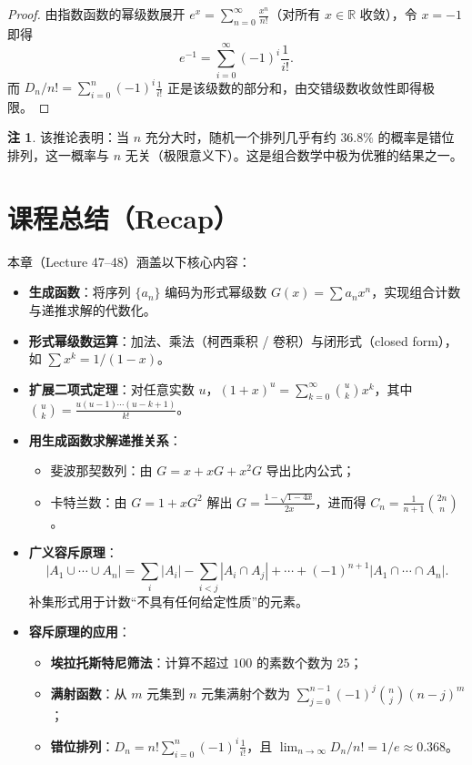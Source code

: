 \documentclass[UTF8,11pt,a4paper]{ctexbook}   %
\theoremstyle{definition}
\newtheorem{remark}{注}[section]
\begin{document}
\begin{proof}
由指数函数的幂级数展开 $e^x=\sum_{n=0}^{\infty}\frac{x^n}{n!}$（对所有 $x\in\mathbb{R}$ 收敛），令 $x=-1$ 即得
\[
e^{-1}=\sum_{i=0}^{\infty}(-1)^i\frac{1}{i!}.
\]
而 $D_n/n!=\sum_{i=0}^{n}(-1)^i\frac{1}{i!}$ 正是该级数的部分和，由交错级数收敛性即得极限。
\end{proof}

\begin{remark}
该推论表明：当 $n$ 充分大时，随机一个排列几乎有约 $36.8\%$ 的概率是错位排列，这一概率与 $n$ 无关（极限意义下）。这是组合数学中极为优雅的结果之一。
\end{remark}

\section*{课程总结（Recap）}

本章（Lecture 47--48）涵盖以下核心内容：

\begin{itemize}
    \item \textbf{生成函数}：将序列 $\{a_n\}$ 编码为形式幂级数 $G(x)=\sum a_n x^n$，实现组合计数与递推求解的代数化。
    \item \textbf{形式幂级数运算}：加法、乘法（柯西乘积 / 卷积）与闭形式（closed form），如 $\sum x^k=1/(1-x)$。
    \item \textbf{扩展二项式定理}：对任意实数 $u$，$(1+x)^u=\sum_{k=0}^{\infty}\binom{u}{k}x^k$，其中 $\binom{u}{k}=\frac{u(u-1)\cdots(u-k+1)}{k!}$。
    \item \textbf{用生成函数求解递推关系}：
    \begin{itemize}
        \item 斐波那契数列：由 $G=x+xG+x^2G$ 导出比内公式；
        \item 卡特兰数：由 $G=1+xG^2$ 解出 $G=\frac{1-\sqrt{1-4x}}{2x}$，进而得 $C_n=\frac{1}{n+1}\binom{2n}{n}$。
    \end{itemize}
    \item \textbf{广义容斥原理}：
    \[
    |A_1\cup\cdots\cup A_n|=\sum_{i}|A_i|-\sum_{i<j}|A_i\cap A_j|+\cdots+(-1)^{n+1}|A_1\cap\cdots\cap A_n|.
    \]
    补集形式用于计数``不具有任何给定性质''的元素。
    \item \textbf{容斥原理的应用}：
    \begin{itemize}
        \item \textbf{埃拉托斯特尼筛法}：计算不超过 $100$ 的素数个数为 $25$；
        \item \textbf{满射函数}：从 $m$ 元集到 $n$ 元集满射个数为 $\sum_{j=0}^{n-1}(-1)^j\binom{n}{j}(n-j)^m$；
        \item \textbf{错位排列}：$D_n=n!\sum_{i=0}^{n}(-1)^i\frac{1}{i!}$，且 $\lim_{n\to\infty}D_n/n!=1/e\approx 0.368$。
    \end{itemize}
\end{itemize}
\end{document}
